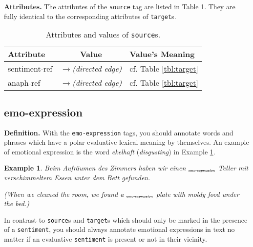 \documentclass[11pt,a4paper]{article}
\newlength{\clmnwidth}
\theoremstyle{mytheoremstyle}
\newtheorem{exmp}{Example}[section]
\newcommand{\mtag}[2]{{\upshape[\emph{#2}\upshape]$_{\textrm{\bfseries\emph{\tiny
        #1}}}$}}
\newcommand{\emoexpression}[2][]{\mtag{emo-\-ex\-pression\ifstrempty{#1}{}{:#1}}{#2}}
\begin{document}
\noindent\textbf{Attributes.} The attributes of the \texttt{source}
tag are listed in Table \ref{tbl:source}.  They are fully identical to
the corresponding attributes of \texttt{target}s.
\begin{center}
  \begin{table}[h]
    \caption{Attributes and values of \texttt{source}s.}
    \begin{tabular}{|l|c|p{0.935\clmnwidth}|}\hline
      Attribute & Value & Value's Meaning\\\hline

      sentiment-ref & \textit{$\longrightarrow$\newline(directed
        edge)} & cf. Table \ref{tbl:target}\\\hline

      anaph-ref & \textit{$\longrightarrow$\newline(directed edge)} &
      cf. Table \ref{tbl:target}\\\hline
    \end{tabular}\label{tbl:source}
  \end{table}
\end{center}

\subsection{emo-expression}
\noindent\textbf{Definition.} With the \texttt{emo-expression} tags,
you should annotate words and phrases which have a polar evaluative
lexical meaning by themselves.  An example of emotional expression is
the word \textit{ekelhaft} (\textit{disgusting}) in Example
\ref{exmp:emo-expr1}.
\begin{exmp}
  Beim Aufr\"aumen des Zimmers haben wir einen
  \emoexpression{ekelhaften} Teller mit verschimmeltem Essen unter dem
  Bett gefunden.

  (When we cleaned the room, we found a \emoexpression{disgusting}
  plate with moldy food under the bed.)\label{exmp:emo-expr1}
\end{exmp}

\noindent{}In contrast to \texttt{source}s and \texttt{target}s which
should only be marked in the presence of a \texttt{sentiment}, you
should always annotate emotional expressions in text no matter if an
evaluative \texttt{sentiment} is present or not in their vicinity.
\end{document}
